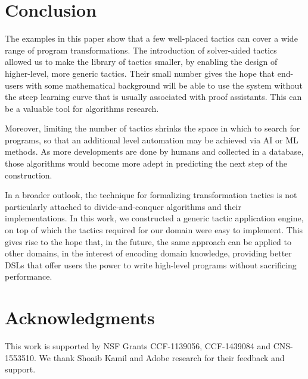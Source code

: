 \section{Conclusion}
\label{conc}

\cbstart{}%
The examples in this paper show that a few well-placed tactics can cover a wide range
of program transformations. The introduction of solver-aided tactics allowed us to make
the library of tactics smaller, by enabling the design of higher-level, more generic
tactics. Their small number gives the hope that end-users with some mathematical background
will be able to use the system without the steep learning curve that is usually associated
with proof assistants. This can be a valuable tool for algorithms research.

Moreover, limiting the number of tactics shrinks the space in which to search for programs,
so that an additional level automation may be achieved via AI or ML methods. As more
developments are done by humans and collected in a database, those algorithms would become
more adept in predicting the next step of the construction.

In a broader outlook, the technique for formalizing transformation tactics is not
particularly attached to divide-and-conquer algorithms and their implementations.
In this work, we constructed a generic tactic application engine, on top of which
the tactics required for our domain were easy to implement.
This gives rise to the hope that, in the future, the same approach can be applied
to other domains, in the interest of encoding domain knowledge, providing better
DSLs that offer users the power to write high-level programs without sacrificing
performance.
\cbend

\section*{Acknowledgments}

This work is supported by NSF Grants CCF-1139056, CCF-1439084 and CNS-1553510. We thank Shoaib Kamil and Adobe research for their feedback and support.
